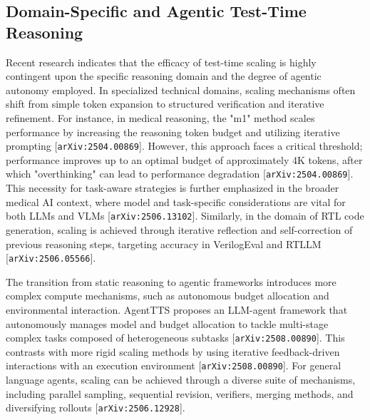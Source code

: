 \documentclass[11pt]{article}
\begin{document}
\subsection{Domain-Specific and Agentic Test-Time Reasoning}

Recent research indicates that the efficacy of test-time scaling is highly contingent upon the specific reasoning domain and the degree of agentic autonomy employed. In specialized technical domains, scaling mechanisms often shift from simple token expansion to structured verification and iterative refinement. For instance, in medical reasoning, the "m1" method scales performance by increasing the reasoning token budget and utilizing iterative prompting [\texttt{arXiv:2504.00869}]. However, this approach faces a critical threshold; performance improves up to an optimal budget of approximately 4K tokens, after which "overthinking" can lead to performance degradation [\texttt{arXiv:2504.00869}]. This necessity for task-aware strategies is further emphasized in the broader medical AI context, where model and task-specific considerations are vital for both LLMs and VLMs [\texttt{arXiv:2506.13102}]. Similarly, in the domain of RTL code generation, scaling is achieved through iterative reflection and self-correction of previous reasoning steps, targeting accuracy in VerilogEval and RTLLM [\texttt{arXiv:2506.05566}].

The transition from static reasoning to agentic frameworks introduces more complex compute mechanisms, such as autonomous budget allocation and environmental interaction. AgentTTS proposes an LLM-agent framework that autonomously manages model and budget allocation to tackle multi-stage complex tasks composed of heterogeneous subtasks [\texttt{arXiv:2508.00890}]. This contrasts with more rigid scaling methods by using iterative feedback-driven interactions with an execution environment [\texttt{arXiv:2508.00890}]. For general language agents, scaling can be achieved through a diverse suite of mechanisms, including parallel sampling, sequential revision, verifiers, merging methods, and diversifying rollouts [\texttt{arXiv:2506.12928}].
\end{document}

